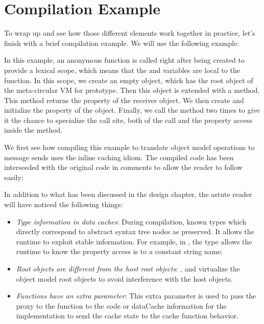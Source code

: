 \section{Compilation Example}

To wrap up and see how those different elements work together in practice,
let's finish with a brief compilation example. We will use the following example:


In this example, an anonymous function is called right after being created to
provide a lexical scope, which means that the  and  variables are
local to the function. In this scope, we create an  empty object, which
has the root object of the meta-circular VM for prototype. Then this object is
extended with a  method. This method returns the  property of
the receiver object. We then create and initialize the  property of the
 object. Finally, we call the  method two times to give it the
chance to specialize the call site, both of the  call and the 
property access inside the  method.

We first see how compiling this example to translate object model operations to
message sends uses the inline caching idiom. The compiled code has been
interseeded with the original code in comments to allow the reader to follow
easily:


\newpage

In addition to what has been discussed in the design chapter, the astute reader will have noticed the following things:
\begin{itemize}
    \item \textit{Type information in data caches}: During compilation, known
    types which directly correspond to abstract syntax tree nodes as preserved.
    It allows the runtime to exploit stable information. For example, in
    , the  type allows the runtime to know the
    property access is to a constant string name.    
    \item \textit{Root objects are different from the host root objects}:
    ,  and  virtualize the
    object model root objects to avoid interference with the host objects.
    \item \textit{Functions have an extra  parameter}: This extra
    parameter is used to pass the proxy to the function to the code or
    dataCache information for the implementation to send the cache state to the
    cache function behavior.
\end{itemize}

